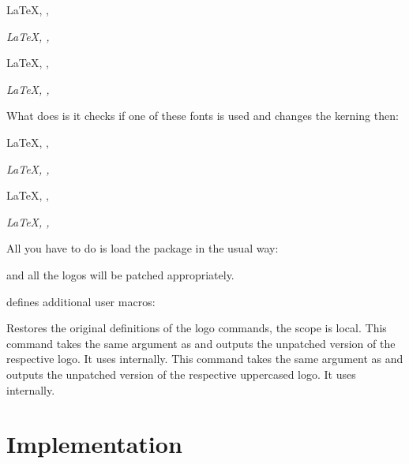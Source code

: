 \documentclass{cnpkgdoc}
\begin{document}
\begin{beispiel}
 \restorelogos\huge
 \LaTeX, \XeLaTeX, \LaTeXTeX \par
 \textit{\LaTeX, \XeLaTeX, \LaTeXTeX}
 
 \sffamily
 \LaTeX, \XeLaTeX, \LaTeXTeX \par
 \textit{\LaTeX, \XeLaTeX, \LaTeXTeX}
\end{beispiel}

What \lbthlpt does is it checks if one of these fonts is used and changes the
kerning then:

\begin{beispiel}
 \huge
 \LaTeX, \XeLaTeX, \LaTeXTeX \par
 \textit{\LaTeX, \XeLaTeX, \LaTeXTeX}
 
 \sffamily
 \LaTeX, \XeLaTeX, \LaTeXTeX \par
 \textit{\LaTeX, \XeLaTeX, \LaTeXTeX}
\end{beispiel}

All you have to do is load the package in the usual \LaTeXe{} way:
\begin{beispiel}
 \usepackage{libertinehologopatch}
\end{beispiel}
and all the logos will be patched appropriately.

\lbthlpt defines additional user macros:
\begin{beschreibung}
 \newline
   Restores the original definitions of the logo commands, the scope is local.
 \newline
   This command takes the same argument as  and outputs the unpatched
   version of the respective logo. It uses  internally.
 \newline
   This command takes the same argument as  and outputs the unpatched
   version of the respective uppercased logo. It uses  internally.
\end{beschreibung}

\section{Implementation}
\implementation

\printindex
\end{document}
